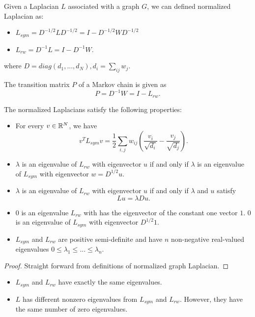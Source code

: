 \begin{refsection}
\begin{definition}\cite{von2007tutorial}
Given a Laplacian $L$ associated with a graph $G$, we can defined normalized Laplacian as:
\begin{itemize}
	\item $L_{sym} = D^{-1/2}LD^{-1/2} = I - D^{-1/2}WD^{-1/2}$
	\item $L_{rw} = D^{-1}L = I - D^{-1}W.$
\end{itemize}
where $D=diag(d_1,...,d_N), d_i = \sum_{ij}w_j$.
\end{definition}


\begin{remark}
	The transition matrix $P$ of a Markov chain is given as
	$$P = D^{-1}W = I - L_{rw}.$$
\end{remark}


\begin{theorem}
The normalized Laplacians satisfy the following properties:
\begin{itemize}
	\item For every $v\in \mathbb{R}^N$, we have
	$$v^TL_{sym}v = \frac{1}{2}\sum_{i,j} w_{ij}(\frac{v_i}{\sqrt{d_i}}-\frac{v_j}{\sqrt{d_j}}).$$
	\item $\lambda$ is an eigenvalue of $L_{rw}$ with eigenvector $u$ if and only if $\lambda$ is an eigenvalue of $L_{sym}$ with eigenvector $w = D^{1/2}u$.
	\item $\lambda$ is an eigenvalue of $L_{rw}$ with eigenvector $u$ if and only if $\lambda$ and $u$ satisfy $$Lu = \lambda Du.$$
	\item 0 is an eigenvalue $L_{rw}$ with has the eigenvector of the constant one vector $1$. 0 is an eigenvalue of $L_{sym}$ with eigenvector $D^{1/2}1$.
	\item $L_{sym}$ and $L_{rw}$ are positive semi-definite and have $n$ non-negative real-valued eigenvalues $0\leq \lambda_1\leq...\leq \lambda_n.$
\end{itemize}
\end{theorem}
\begin{proof}
Straight forward from definitions of normalized graph Laplacian.
\end{proof}
\begin{remark}\hfill
\begin{itemize}
	\item $L_{sym}$ and $L_{rw}$ have exactly the same eigenvalues.
	\item $L$ has different nonzero eigenvalues from $L_{sym}$ and $L_{rw}$. However, they have the same number of zero eigenvalues.
\end{itemize}	
\end{remark}



\end{refsection}
